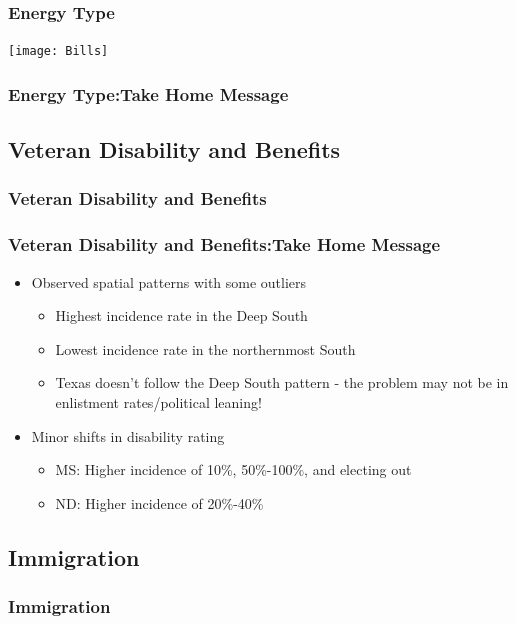 \documentclass{beamer}
\begin{document}
\begin{frame}
\frametitle{Energy Type}
\begin{center} 
\texttt{[image: Bills]}

\end{center}


\end{frame}

\begin{frame}
\frametitle{Energy Type:Take Home Message}


\end{frame}

\subsection{Veteran Disability and Benefits}
\begin{frame}
\frametitle{Veteran Disability and Benefits}



\end{frame}

\begin{frame}
\frametitle{Veteran Disability and Benefits:Take Home Message}
\begin{itemize}
\item Observed spatial patterns with some outliers
\begin{itemize}
\item Highest incidence rate in the Deep South
\item Lowest incidence rate in the northernmost South
\item Texas doesn't follow the Deep South pattern - the problem may not be in enlistment rates/political leaning!
\end{itemize}
\item Minor shifts in disability rating
\begin{itemize}
\item MS: Higher incidence of 10\%, 50\%-100\%, and electing out
\item ND: Higher incidence of 20\%-40\%
\end{itemize}
\end{itemize}

\end{frame}

\subsection{Immigration }
\begin{frame}
\frametitle{Immigration }



\end{frame}
\end{document}
